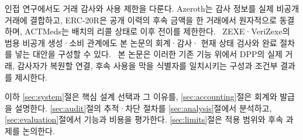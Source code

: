 인접 연구에서도 거래 감사와 사용 제한을 다룬다. Azeroth는 감사
정보를 실제 비공개 거래에 결합하고, ERC-20R은 공개 이력의 후속
금액을 한 거래에서 원자적으로 동결하며, ACTMeds는 배치의 리콜
상태로 이후 전이를 제한한다.~\cite{jeong-azeroth-2023,
wang-erc20r-2022,sitaula-actmeds-2026}
ZEXE·VeriZexe의 범용 비공개 생성·소비 관계에도 본 논문의 회계·감사·
현재 상태 검사와 완료 절차를 넣는 대안을 구성할 수
있다.~\cite{bowe-zexe-2020,xiong-verizexe-2023}
본 논문은 이러한 기존 기능 위에서 DPP의 실제 거래, 감사자가 복원할
연결, 후속 사용을 막을 식별자를 일치시키는 구성과 조건부 결과를
제시한다.

이하 \ref{sec:system}절은 핵심 설계 선택과 그 이유를,
\ref{sec:accounting}절은 회계와 발급을 설명한다.
\ref{sec:audit}절의 추적·차단 절차를 \ref{sec:analysis}절에서
분석하고, \ref{sec:evaluation}절에서 기능과 비용을 평가한다.
\ref{sec:limits}절은 적용 범위와 후속 과제를 논의한다.
